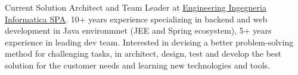 

\begin{cvparagraph}

Current Solution Architect and Team Leader at \href{www.eng.it}{Engineering Ingegneria Informatica SPA}. 10+ years experience specializing in backend and web development in Java environmnet (JEE and Spring ecosystem), 5+ years experience in leading dev team. Interested in devising a better problem-solving method for challenging tasks, in architect, design, test and develop the best solution for the customer needs and learning new technologies and tools.
\end{cvparagraph}
